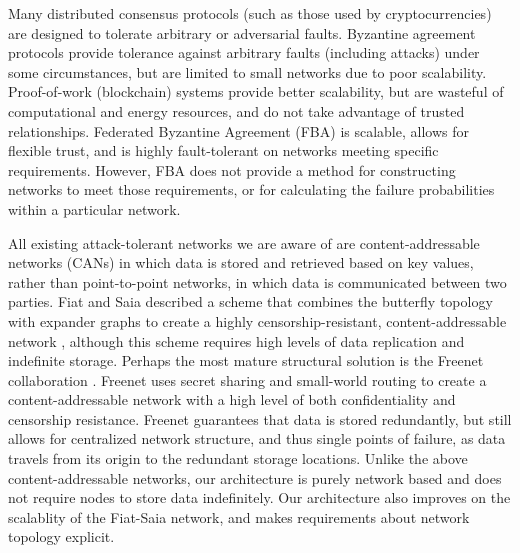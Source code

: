 \documentclass[10pt,letterpaper]{article}
\begin{document}
Many distributed consensus protocols (such as those used by cryptocurrencies)
are designed to tolerate arbitrary or adversarial faults.
Byzantine agreement protocols
\cite{lamport_byzantine_1982,castro_practical_1999}
provide tolerance against arbitrary faults (including attacks) under
some circumstances, but are limited to small networks due to poor scalability.
Proof-of-work \cite{dwork_pricing_1993,nakamoto_bitcoin:_2008} (blockchain)
systems provide better scalability,
but are wasteful of computational and energy resources,
and do not take advantage of trusted relationships.
Federated Byzantine Agreement (FBA) \cite{mazieres_stellar_2015}
is scalable, allows for flexible trust,
and is highly fault-tolerant on networks meeting specific requirements.
However, FBA does not provide a method for constructing networks to meet
those requirements,
or for calculating the failure probabilities within a particular network.

All existing attack-tolerant networks we are aware of are content-addressable
networks (CANs) in which data is stored and retrieved based on key values,
rather than point-to-point networks, in which data is communicated between
two parties.
Fiat and Saia described a scheme that combines the butterfly topology
with expander graphs to create a highly censorship-resistant,
content-addressable network \cite{fiat_censorship_2002},
although this scheme requires high levels of data replication and indefinite
storage.
Perhaps the most mature structural solution is the Freenet collaboration
\cite{clarke_freenet:_2001}.
Freenet uses secret sharing
\cite{shamir_how_1979, blakley_safeguarding_1979}
and small-world routing
\cite{zhang_using_2002,kleinberg_small-world_2000}
to create a content-addressable network with a high level of both
confidentiality and censorship resistance.
Freenet guarantees that data is stored redundantly,
but still allows for centralized network structure,
and thus single points of failure,
as data travels from its origin to the redundant storage locations.
Unlike the above content-addressable networks, our architecture is purely network based
and does not require nodes to store data indefinitely.
Our architecture also improves on the scalablity of the Fiat-Saia network,
and makes requirements about network topology explicit.
\end{document}
